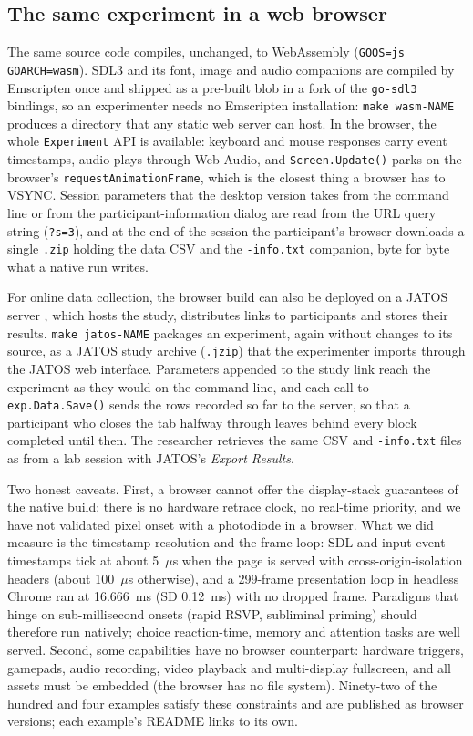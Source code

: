 \documentclass[doc,a4paper,floatsintext]{apa7}
\begin{document}
\subsection{The same experiment in a web browser}\label{browser}

The same source code compiles, unchanged, to WebAssembly
(\texttt{GOOS=js GOARCH=wasm}). SDL3 and its font, image and audio
companions are compiled by Emscripten once and shipped as a pre-built
blob in a fork of the \texttt{go-sdl3} bindings, so an experimenter
needs no Emscripten installation: \texttt{make wasm-NAME} produces a
directory that any static web server can host. In the browser, the
whole \texttt{Experiment} API is available: keyboard and mouse
responses carry event timestamps, audio plays through Web Audio, and
\texttt{Screen.Update()} parks on the browser's
\texttt{requestAnimationFrame}, which is the closest thing a browser
has to VSYNC. Session parameters that the desktop version takes from
the command line or from the participant-information dialog are read
from the URL query string (\texttt{?s=3}), and at the end of the
session the participant's browser downloads a single \texttt{.zip}
holding the data CSV and the \texttt{-info.txt} companion, byte for
byte what a native run writes.

For online data collection, the browser build can also be deployed on a
JATOS server \parencite{lange2015}, which hosts the study, distributes
links to participants and stores their results. \texttt{make jatos-NAME}
packages an experiment, again without changes to its source, as a
JATOS study archive (\texttt{.jzip}) that the experimenter imports
through the JATOS web interface. Parameters appended to the study link
reach the experiment as they would on the command line, and each call
to \texttt{exp.Data.Save()} sends the rows recorded so far to the
server, so that a participant who closes the tab halfway through
leaves behind every block completed until then. The researcher
retrieves the same CSV and \texttt{-info.txt} files as from a lab
session with JATOS's \emph{Export Results}.

Two honest caveats. First, a browser cannot offer the display-stack
guarantees of the native build: there is no hardware retrace clock,
no real-time priority, and we have not validated pixel onset with a
photodiode in a browser. What we did measure is the timestamp
resolution and the frame loop: SDL and input-event timestamps tick at
about 5~$\mu$s when the page is served with cross-origin-isolation
headers (about 100~$\mu$s otherwise), and a 299-frame presentation
loop in headless Chrome ran at 16.666~ms (SD 0.12~ms) with no dropped
frame. Paradigms that hinge on sub-millisecond onsets (rapid RSVP,
subliminal priming) should therefore run natively; choice
reaction-time, memory and attention tasks are well served. Second,
some capabilities have no browser counterpart: hardware triggers,
gamepads, audio recording, video playback and multi-display
fullscreen, and all assets must be embedded (the browser has no file
system). Ninety-two of the hundred and four examples satisfy these
constraints and are published as browser versions; each example's
README links to its own.
\end{document}
